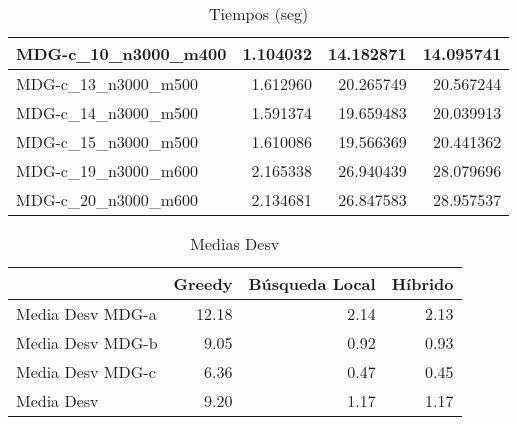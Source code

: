 \documentclass[10pt,a4paper]{article}
\begin{document}
\begin{table}[]
\begin{tabular}{|l|r|r|r|}
		MDG-c\_10\_n3000\_m400              & 1.104032                             & 14.182871                                    & 14.095741                             \\ \hline
		MDG-c\_13\_n3000\_m500              & 1.612960                             & 20.265749                                    & 20.567244                             \\ \hline
		MDG-c\_14\_n3000\_m500              & 1.591374                             & 19.659483                                    & 20.039913                             \\ \hline
		MDG-c\_15\_n3000\_m500              & 1.610086                             & 19.566369                                    & 20.441362                             \\ \hline
		MDG-c\_19\_n3000\_m600              & 2.165338                             & 26.940439                                    & 28.079696                             \\ \hline
		MDG-c\_20\_n3000\_m600              & 2.134681                             & 26.847583                                    & 28.957537                             \\ \hline
	\end{tabular}
	\caption{Tiempos (seg)}
	\label{table:tiempos}
\end{table}


\begin{table}[]
	\centering
	\begin{tabular}{l|r|r|r|}
		\cline{2-4}
		\multicolumn{1}{c|}{\textbf{}}         & \multicolumn{1}{c|}{\textbf{Greedy}} & \multicolumn{1}{c|}{\textbf{Búsqueda Local}} & \multicolumn{1}{c|}{\textbf{Híbrido}} \\ \hline
		\multicolumn{1}{|l|}{Media Desv MDG-a} & 12.18                                & 2.14                                         & 2.13                                  \\ \hline
		\multicolumn{1}{|l|}{Media Desv MDG-b} & 9.05                                 & 0.92                                         & 0.93                                  \\ \hline
		\multicolumn{1}{|l|}{Media Desv MDG-c} & 6.36                                 & 0.47                                         & 0.45                                  \\ \hline
		\multicolumn{1}{|l|}{Media Desv}       & 9.20                                 & 1.17                                         & 1.17                                  \\ \hline
	\end{tabular}
	\caption{Medias Desv}
	\label{table:medias_desv}
\end{table}
\end{document}
